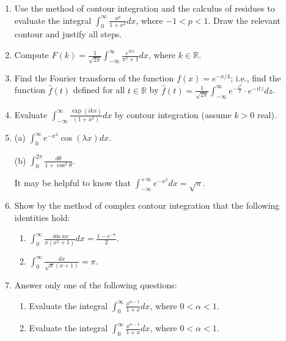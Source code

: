 \documentclass[a4paper,10pt]{article}
\begin{document}
\begin{enumerate}
\item 
	
	Use the method of contour integration and the calculus of residues to evaluate the integral $\int_{0}^{\infty}\frac{x^{p}}{1+x^{2}}dx$, where $-1 < p < 1$. Draw the relevant contour and justify all steps.
	
\item 
	
	Compute $F(k) = \frac{1}{\sqrt{2\pi}}\int_{-\infty}^{\infty}\frac{e^{ikx}}{\pi^{2}+1}dx$, where $k \in \mathbb{R}$.
	
\item 
	
	Find the Fourier transform of the function $f(x) = e^{-x/4}$; i.e., find the function $\hat{f}(t)$ defined for all $t \in \mathbb{R}$ by $\hat{f}(t) = \frac{1}{\sqrt{2\pi}}\int_{-\infty}^{\infty}e^{-\frac{z^{2}}{2}} \cdot e^{-itz}dz$.
	
\item 
	
	Evaluate $\int_{-\infty}^{\infty}\frac{\exp(ikx)}{(1+x^{2})}dx$ by contour integration (assume $k > 0$ real).
	
\item 
	(a) $\int_{0}^{\infty}e^{-x^{2}}\cos(\lambda x)dx$.
	
	(b) $\int_{0}^{2\pi}\frac{d\theta}{1+\cos^{2}\theta}$.
	
	It may be helpful to know that $\int_{-\infty}^{+\infty}e^{-x^{2}}dx = \sqrt{\pi}$.
	
\item 
	
	Show by the method of complex contour integration that the following identities hold:
	\begin{enumerate}
	\item $\int_{0}^{\infty}\frac{\sin ax}{x(x^{2}+1)}dx = \frac{1-e^{-a}}{2}$.
	
	\item $\int_{0}^{\infty}\frac{dx}{\sqrt{x}(x+1)} = \pi$.
	\end{enumerate}
	
\item 
	
	Answer only one of the following questions:
	
	\begin{enumerate}
		\item Evaluate the integral $\int_{0}^{\infty}\frac{x^{\alpha-1}}{1+x}dx$, where $0 < \alpha < 1$.
		\item Evaluate the integral $\int_{0}^{\infty}\frac{x^{\alpha-1}}{1+x}dx$, where $0 < \alpha < 1$.
	\end{enumerate}



\end{enumerate}
\end{document}
